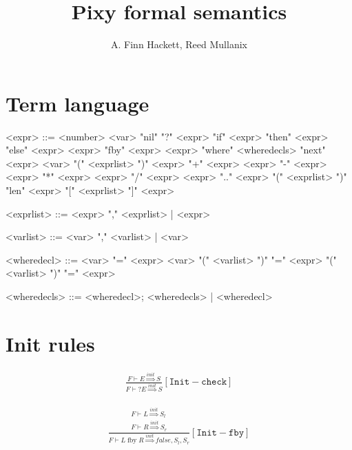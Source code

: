 \documentclass{scrartcl}
\DeclareMathOperator{\fby}{fby}
\begin{document}
    \title{Pixy formal semantics}
    \author{A. Finn Hackett, Reed Mullanix}
    \maketitle
    
    \section{Term language}
    
    \begin{grammar}
        <expr> ::= <number>
            \alt <var>
            \alt "nil"
            \alt "?" <expr>
            \alt "if" <expr> "then" <expr> "else" <expr>
            \alt <expr> "fby" <expr>
            \alt <expr> "where" <wheredecls>
            \alt "next" <expr>
            \alt <var> "(" <exprlist> ")"
            \alt <expr> "+" <expr>
            \alt <expr> "-" <expr>
            \alt <expr> "*" <expr>
            \alt <expr> "/" <expr>
            \alt <expr> ".." <expr>
            \alt "(" <exprlist> ")"
            \alt "len" <expr>
            \alt "[" <exprlist> "]" <expr> 
        
        <exprlist> ::= <expr> "," <exprlist> | <expr>
        
        <varlist> ::= <var> "," <varlist> | <var>
        
        <wheredecl> ::= <var> "=" <expr> 
            \alt <var> "(" <varlist> ")" "=" <expr>
            \alt "(" <varlist> ")" "=" <expr>
            
        <wheredecls> ::= <wheredecl>; <wheredecls> | <wheredecl>
    \end{grammar}

    \section{Init rules}
    
    \begin{align*}
    \frac{
        F \vdash E \overset{init}{\Rightarrow} S
    }{
        F \vdash ?E \overset{init}{\Rightarrow} S
    }[\mathtt{Init-check}]
    \end{align*}
    
    \begin{align*}
    \frac{
        \begin{matrix}
        F \vdash L \overset{init}{\Rightarrow} S_l \\
        F \vdash R \overset{init}{\Rightarrow} S_r
        \end{matrix}
    }{
        F \vdash L \fby R \overset{init}{\Rightarrow} false, S_l, S_r
    }[\mathtt{Init-fby}]
    \end{align*}
    
\end{document}
